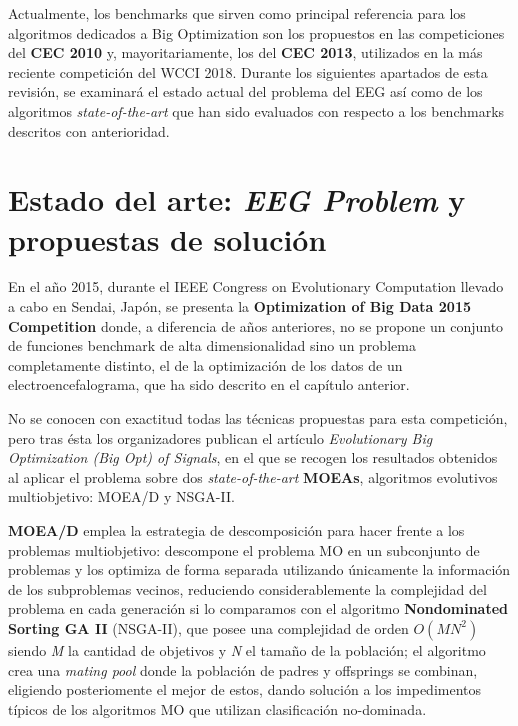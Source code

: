 Actualmente, los benchmarks que sirven como principal referencia para los algoritmos dedicados a Big Optimization son los propuestos en las competiciones del \textbf{CEC 2010} y, mayoritariamente, los del \textbf{CEC 2013}, utilizados en la más reciente competición del WCCI 2018\cite{WCCI-SHADEILS}. Durante los siguientes apartados de esta revisión, se examinará el estado actual del problema del EEG así como de los algoritmos \textit{state-of-the-art} que han sido evaluados con respecto a los benchmarks descritos con anterioridad.


\section{Estado del arte: \textit{EEG Problem} y propuestas de solución}

En el año 2015, durante el IEEE Congress on Evolutionary Computation llevado a cabo en Sendai, Japón\cite{IEEE-CEC2015}, se presenta la  \textbf{Optimization of Big Data 2015 Competition}\cite{CompetitionBigOpt} donde, a diferencia de años anteriores, no se propone un conjunto de funciones benchmark de alta dimensionalidad sino un problema completamente distinto, el de la optimización de los datos de un electroencefalograma, que ha sido descrito en el capítulo anterior.

No se conocen con exactitud todas las técnicas propuestas para esta competición, pero tras ésta los organizadores publican el artículo \textit{Evolutionary Big Optimization (Big Opt) of Signals}\cite{EvolutionaryBigOpt}, en el que se recogen los resultados obtenidos al aplicar el problema sobre dos \textit{state-of-the-art} \textbf{MOEAs}, algoritmos evolutivos multiobjetivo: MOEA/D y NSGA-II.

\textbf{MOEA/D}\cite{MOEA/D} emplea la estrategia de descomposición para hacer frente a los problemas multiobjetivo: descompone el problema MO en un subconjunto de problemas y los optimiza de forma separada utilizando únicamente la información de los subproblemas vecinos, reduciendo considerablemente la complejidad del problema en cada generación si lo comparamos con el algoritmo \textbf{Nondominated Sorting GA II} (NSGA-II)\cite{NSGA-II}, que posee una complejidad de orden $O(MN^2)$ siendo \textit{M} la cantidad de objetivos y \textit{N} el tamaño de la población; el algoritmo crea una \textit{mating pool} donde la población de padres y offsprings se combinan, eligiendo posteriomente el mejor de estos, dando solución a los impedimentos típicos de los algoritmos MO que utilizan clasificación no-dominada.

